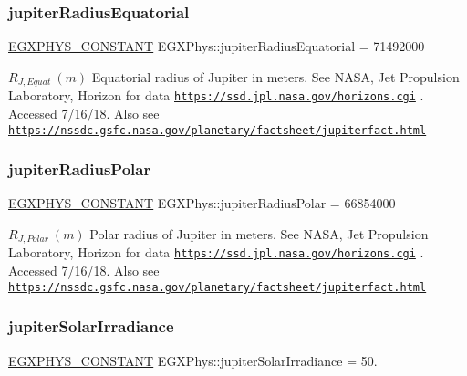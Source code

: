 \subsubsection{\texorpdfstring{jupiter\+Radius\+Equatorial}{jupiterRadiusEquatorial}}
{\footnotesize\ttfamily \mbox{\hyperlink{group___e_g_x_phys-_constants-_macros_ga76980d288494ce1714c9ac68a95ba702}{E\+G\+X\+P\+H\+Y\+S\+\_\+\+C\+O\+N\+S\+T\+A\+NT}} E\+G\+X\+Phys\+::jupiter\+Radius\+Equatorial = 71492000}

$R_{J,Equat} \ (m)$ Equatorial radius of Jupiter in meters. See N\+A\+SA, Jet Propulsion Laboratory, Horizon for data \href{https://ssd.jpl.nasa.gov/horizons.cgi}{\tt https\+://ssd.\+jpl.\+nasa.\+gov/horizons.\+cgi} . Accessed 7/16/18. Also see \href{https://nssdc.gsfc.nasa.gov/planetary/factsheet/jupiterfact.html}{\tt https\+://nssdc.\+gsfc.\+nasa.\+gov/planetary/factsheet/jupiterfact.\+html} \mbox{\label{group___e_g_x_phys-_constants-_astrophysics-_solar_system-_jupiter-_bulk_ga7b2626988078bb3648e4a4238b36c825}} 
\subsubsection{\texorpdfstring{jupiter\+Radius\+Polar}{jupiterRadiusPolar}}
{\footnotesize\ttfamily \mbox{\hyperlink{group___e_g_x_phys-_constants-_macros_ga76980d288494ce1714c9ac68a95ba702}{E\+G\+X\+P\+H\+Y\+S\+\_\+\+C\+O\+N\+S\+T\+A\+NT}} E\+G\+X\+Phys\+::jupiter\+Radius\+Polar = 66854000}

$R_{J,Polar} \ (m)$ Polar radius of Jupiter in meters. See N\+A\+SA, Jet Propulsion Laboratory, Horizon for data \href{https://ssd.jpl.nasa.gov/horizons.cgi}{\tt https\+://ssd.\+jpl.\+nasa.\+gov/horizons.\+cgi} . Accessed 7/16/18. Also see \href{https://nssdc.gsfc.nasa.gov/planetary/factsheet/jupiterfact.html}{\tt https\+://nssdc.\+gsfc.\+nasa.\+gov/planetary/factsheet/jupiterfact.\+html} \mbox{\label{group___e_g_x_phys-_constants-_astrophysics-_solar_system-_jupiter-_bulk_gaba342d5906a24c551ea5c3328b536b29}} 
\subsubsection{\texorpdfstring{jupiter\+Solar\+Irradiance}{jupiterSolarIrradiance}}
{\footnotesize\ttfamily \mbox{\hyperlink{group___e_g_x_phys-_constants-_macros_ga76980d288494ce1714c9ac68a95ba702}{E\+G\+X\+P\+H\+Y\+S\+\_\+\+C\+O\+N\+S\+T\+A\+NT}} E\+G\+X\+Phys\+::jupiter\+Solar\+Irradiance = 50.}

